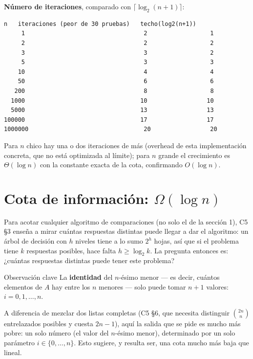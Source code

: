 \documentclass[11pt]{article}
\begin{document}
\textbf{Número de iteraciones}, comparado con $\lceil\log_2(n{+}1)\rceil$:
\begin{lstlisting}[style=salida]
     n   iteraciones (peor de 30 pruebas)   techo(log2(n+1))
     1                                  2                  1
     2                                  2                  2
     3                                  3                  2
     5                                  3                  3
    10                                  4                  4
    50                                  6                  6
   200                                  8                  8
  1000                                 10                 10
  5000                                 13                 13
100000                                 17                 17
1000000                                 20                 20
\end{lstlisting}
Para $n$ chico hay una o dos iteraciones de más (overhead de esta implementación concreta, que no está
optimizada al límite); para $n$ grande el crecimiento es $\Theta(\log n)$ con la constante exacta de la
cota, confirmando $O(\log n)$.

\section{Cota de información: \texorpdfstring{$\Omega(\log n)$}{Omega(log n)}}

Para acotar cualquier algoritmo de comparaciones (no solo el de la sección 1), C5 §3 enseña a mirar cuántas
respuestas distintas puede llegar a dar el algoritmo: un árbol de decisión con $h$ niveles tiene a lo sumo
$2^h$ hojas, así que si el problema tiene $k$ respuestas posibles, hace falta $h\ge\log_2 k$. La pregunta
entonces es: ¿cuántas respuestas distintas puede tener este problema?

\begin{resultado}{Observación clave}
La \textbf{identidad} del $n$-ésimo menor --- es decir, cuántos elementos de $A$ hay entre los $n$ menores
--- solo puede tomar $n{+}1$ valores: $i=0,1,\dots,n$.
\end{resultado}

A diferencia de mezclar dos listas completas (C5 §6, que necesita distinguir $\binom{2n}{n}$
entrelazados posibles y cuesta $2n{-}1$), aquí la salida que se pide es mucho más pobre: un solo número
(el valor del $n$-ésimo menor), determinado por un solo parámetro $i\in\{0,\dots,n\}$. Esto sugiere, y
resulta ser, una cota mucho más baja que lineal.
\end{document}
